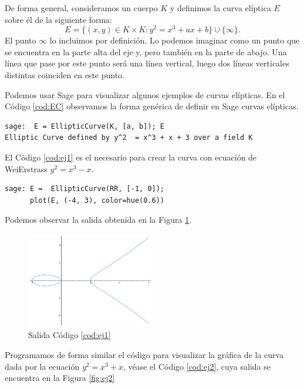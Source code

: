 \documentclass[11pt]{article}
\begin{document}
De forma general, consideramos un cuerpo $K$ y definimos la curva elíptica $E$ sobre él de la siguiente forma:
\[E = \{(x,y) \in K\times K : y^2 = x^3 + ax +b\} \cup \{\infty\}.
\]
El punto $\infty$ lo incluimos por definición. Lo podemos imaginar como un punto que se encuentra en la parte alta del eje y, pero también en la parte de abajo. Una línea que pase por este punto será una línea vertical, luego dos líneas verticales distintas coinciden en este punto.

Podemos usar Sage para visualizar algunos ejemplos de curvas elípticas. En el Código \ref{cod:EC} observamos la forma genérica de definir en Sage curvas elípticas.

\begin{lstlisting}[label={cod:EC}, caption={Curva elíptica en Sage}, morekeywords={sage}]
sage:  E = EllipticCurve(K, [a, b]); E
Elliptic Curve defined by y^2  = x^3 + x + 3 over a field K
\end{lstlisting}

El Código \ref{cod:ej1} es el necesario para crear la curva con ecuación de WeiErstrass $y^2=x^3-x$.

\begin{lstlisting}[label={cod:ej1}, caption={Curva elíptica $y^2=x^3-x$}, morekeywords={sage}]
sage: E =  EllipticCurve(RR, [-1, 0]);
      plot(E, (-4, 3), color=hue(0.6))
\end{lstlisting}

Podemos observar la salida obtenida en la Figura \ref{fig:ej1}.

\begin{figure}[H]
    \centering
    \includegraphics[width=0.5\textwidth]{ej1}
    \caption{Salida Código \ref{cod:ej1}}
    \label{fig:ej1}
\end{figure}

Programamos de forma similar el código para visualizar la gráfica de la curva dada por la ecuación $y^2=x^3+x$, véase el Código \ref{cod:ej2}, cuya salida se encuentra en la Figura \ref{fig:ej2}
\end{document}
